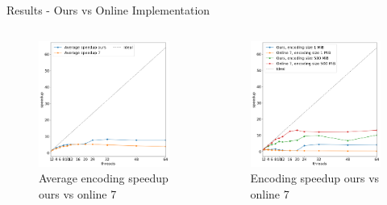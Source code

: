 \begin{frame}{Results - Ours vs Online Implementation}
    \begin{columns}
            \begin{figure}
                \centering
                \includegraphics[width=\textwidth]{imgs/average ours vs 7}
                \caption{Average encoding speedup ours vs online 7}
                \label{fig:encoding-speedup}
            \end{figure}
            \begin{figure}
                \centering
                \includegraphics[width=\textwidth]{imgs/ours vs online 7 1-500}
                \caption{Encoding speedup ours vs online 7}
                \label{fig:encoding-efficiency}
            \end{figure}
    \end{columns}
\end{frame}
